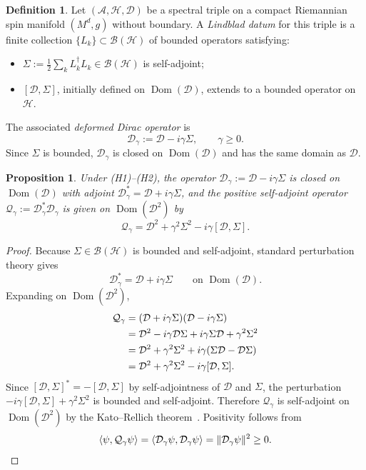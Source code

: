 \documentclass[11pt,a4paper]{article}
\numberwithin{equation}{section}
\newtheorem{Proposition}[Theorem]{Proposition}
\theoremstyle{definition}
\newtheorem{Definition}[Theorem]{Definition}
\newcommand{\cA}{\mathcal{A}}
\newcommand{\cH}{\mathcal{H}}
\newcommand{\cD}{\mathcal{D}}
\newcommand{\Qg}{\mathcal{Q}_\gamma}
\newcommand{\Dg}{\mathcal{D}_\gamma}
\newcommand{\Sig}{\Sigma}
\newcommand{\Dom}{\operatorname{Dom}}
\begin{document}
\begin{Definition}
\label{def:lindbladatum}
Let $(\cA, \cH, \cD)$ be a spectral triple on a compact Riemannian spin
manifold $(M^d, g)$ without boundary. A \emph{Lindblad datum} for this
triple is a finite collection $\{L_k\} \subset \mathcal{B}(\cH)$ of
bounded operators satisfying:
\begin{itemize}[leftmargin=2.2em]
  \item[(H1)] $\Sig := \tfrac{1}{2}\sum_k L_k^\dagger L_k \in
              \mathcal{B}(\cH)$ is self-adjoint;
  \item[(H2)] $[\cD, \Sig]$, initially defined on $\Dom(\cD)$, extends
              to a bounded operator on $\cH$.
\end{itemize}
The associated \emph{deformed Dirac operator} is
\begin{equation}
\Dg:=\cD-i\gamma\Sig, \qquad \gamma\ge 0.
\end{equation}
Since $\Sig$ is bounded, $\Dg$ is closed on $\Dom(\cD)$ and has the same
domain as $\cD$.
\end{Definition}

\begin{Proposition}
\label{prop:Qgamma}
Under \textup{(H1)--(H2)}, the operator $\Dg := \cD - i\gamma\Sig$ is
closed on $\Dom(\cD)$ with adjoint $\Dg^* = \cD + i\gamma\Sig$, and the
positive self-adjoint operator $\Qg := \Dg^*\Dg$ is given on
$\Dom(\cD^2)$ by
\begin{equation}
  \Qg = \cD^2 + \gamma^2\Sig^2 - i\gamma[\cD,\Sig].
  \label{eq:Qgformula}
\end{equation}
\end{Proposition}

\begin{proof}
Because $\Sig\in \mathcal{B}(\cH)$ is bounded and self-adjoint, standard
perturbation theory gives
\begin{equation}
\Dg^*=\cD+i\gamma\Sig
\qquad \text{on }\Dom(\cD).
\end{equation}
Expanding on $\Dom(\cD^2)$,
\begin{align}
\Qg
&=(\cD+i\gamma\Sig)(\cD-i\gamma\Sig)\notag\\
&=\cD^2-i\gamma\cD\Sig+i\gamma\Sig\cD+\gamma^2\Sig^2\notag\\
&=\cD^2+\gamma^2\Sig^2+i\gamma(\Sig\cD-\cD\Sig)\notag\\
&=\cD^2+\gamma^2\Sig^2-i\gamma[\cD,\Sig].
\end{align}
Since $[\cD,\Sig]^*=-[\cD,\Sig]$ by self-adjointness of $\cD$ and
$\Sig$, the perturbation $-i\gamma[\cD,\Sig]+\gamma^2\Sig^2$ is bounded
and self-adjoint. Therefore $\Qg$ is self-adjoint on $\Dom(\cD^2)$ by the
Kato--Rellich theorem~\cite{Vassilevich2003}. Positivity follows from
\begin{equation}
\langle \psi,\Qg\psi\rangle=\langle \Dg\psi,\Dg\psi\rangle=
\|\Dg\psi\|^2\ge 0.\qedhere
\end{equation}
\end{proof}
\end{document}
